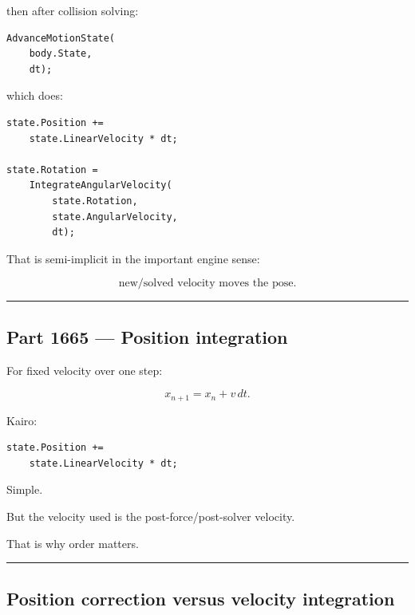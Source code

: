 then after collision solving:

\begin{verbatim}
AdvanceMotionState(
    body.State,
    dt);
\end{verbatim}

which does:

\begin{verbatim}
state.Position +=
    state.LinearVelocity * dt;

state.Rotation =
    IntegrateAngularVelocity(
        state.Rotation,
        state.AngularVelocity,
        dt);
\end{verbatim}

That is semi-implicit in the important engine sense:

\[
\boxed{
\text{new/solved velocity moves the pose.}
}
\]

\begin{center}\rule{0.5\linewidth}{0.5pt}\end{center}

\subsection{Part 1665 --- Position integration}\label{06-engine-ii-ch037-part-1665-position-integration}

\hypertarget{06-engine-ii-ch037-part-1665-position-integration}{}

For fixed velocity over one step:

\[
\boxed{
x_{n+1}
=
x_n+v\,dt.
}
\]

Kairo:

\begin{verbatim}
state.Position +=
    state.LinearVelocity * dt;
\end{verbatim}

Simple.

But the velocity used is the post-force/post-solver velocity.

That is why order matters.

\begin{center}\rule{0.5\linewidth}{0.5pt}\end{center}

\subsection{Position correction versus velocity integration}\label{06-engine-ii-ch037-position-correction-versus-velocity-integration}

\hypertarget{06-engine-ii-ch037-position-correction-versus-velocity-integration}{}

